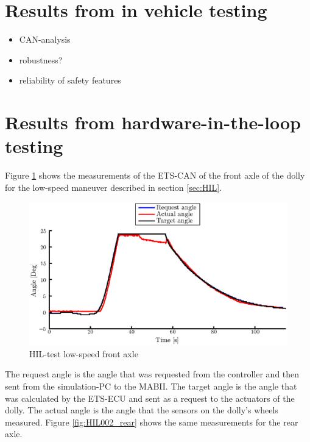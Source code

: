 \documentclass[ExampleMasters.tex]{subfiles}
\begin{document}
\section{Results from in vehicle testing}
\label{sec:results_vehicle_testing}




\begin{itemize}
	\item CAN-analysis
	\item robustness?
	\item reliability of safety features
\end{itemize}
\section{Results from hardware-in-the-loop testing}

Figure \ref{fig:HIL002_front} shows the measurements of the ETS-CAN of the front axle of the dolly for the low-speed maneuver described in section \ref{sec:HIL}.\\

\begin{figure}[!htb]
	\centering
	\includegraphics[width=1\linewidth]{figures/HIL002_front}
	\caption{HIL-test low-speed front axle}
	
	\label{fig:HIL002_front}
\end{figure}

The request angle is the angle that was requested from the controller and then sent from the simulation-PC to the MABII. The target angle is the angle that was calculated by the ETS-ECU and sent as a request to the actuators of the dolly. The actual angle is the angle that the sensors on the dolly's wheels measured.
Figure \ref{fig:HIL002_rear} shows the same measurements for the rear axle.
\end{document}
